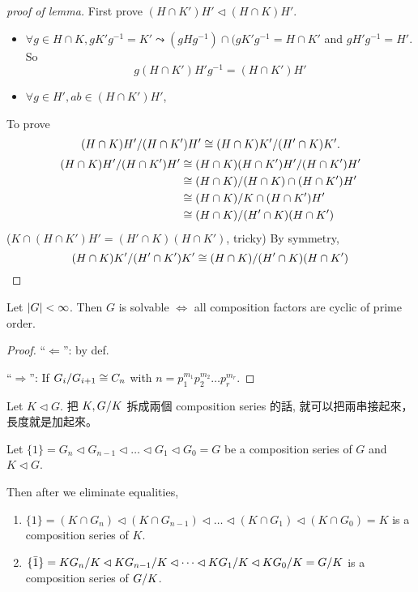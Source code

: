 \begin{proof}[proof of lemma]
  First prove $(H\cap K')H' \lhd (H\cap K)H'$.
  \begin{itemize}
    \item $\forall g \in H \cap K, g K'g^{-1} = K' \leadsto
      (gHg^{-1}) \cap (gK'g^{-1} = H \cap K'$ and $gH'g^{-1} = H'$. So
      \[ g(H\cap K')H'g^{-1} = (H\cap K')H' \]
    \item $\forall g \in H', ab \in (H\cap K')H'$, 
  \end{itemize}

  To prove
  \[
    {(H\cap K)H'}/{(H\cap K')H'} \cong {(H\cap K)K'}/{(H'\cap K)K'}.
  \]
  \begin{align*}
    {(H\cap K)H'}/{(H\cap K')H'} &\cong
    {(H\cap K)(H\cap K')H'}/{(H\cap K')H'} \\
    &\cong {(H\cap K)}/{(H\cap K)\cap(H\cap K')H'} \\
    &\cong {(H\cap K)}/{K\cap(H\cap K')H'} \\
    &\cong {(H\cap K)}/{(H'\cap K)(H\cap K')}
  \end{align*}
  ($K\cap(H\cap K')H' = (H'\cap K)(H\cap K')$, tricky)
  By symmetry, 
  \[
    {(H\cap K)K'}/{(H'\cap K')K'} \cong
    {(H\cap K)}/{(H'\cap K)(H\cap K')}
  \]
\end{proof}

\begin{prop}
  Let $\lvert G\rvert < \infty$. Then $G$ is solvable $\iff$ all composition factors
  are cyclic of prime order.
  \begin{proof}
    ``$\Leftarrow$'': by def.

    ``$\Rightarrow$'': If ${G_i}/{G_{i+1}} \cong C_n$ with
    $n = p_1^{m_1} p_2^{m_2} \dots p_r^{m_r}$.
  \end{proof}
\end{prop}

\begin{observation*}
  Let $K \lhd G$. 把 $K, {G}/{K}$ 拆成兩個 composition series 的話,
  就可以把兩串接起來，長度就是加起來。
\end{observation*}

\begin{exercise}
  Let $\{1\} = G_n \lhd G_{n-1} \lhd \dots \lhd G_1 \lhd G_0 = G$ be a
  composition series of $G$ and $K \lhd G$.

  Then after we eliminate equalities,
  \begin{enumerate}
    \item $\{1\} = (K \cap G_n) \lhd (K \cap G_{n-1}) \lhd \dots \lhd
      (K \cap G_1) \lhd (K \cap G_0) = K$ is a composition series of $K$.
    \item $\{\bar{1}\} = {KG_n}/{K} \lhd {KG_{n-1}}/{K} \lhd \dots \lhd
      {KG_1}/{K} \lhd {KG_0}/{K} = {G}/{K}$ is a composition
      series of ${G}/{K}$.
  \end{enumerate}
\end{exercise}


